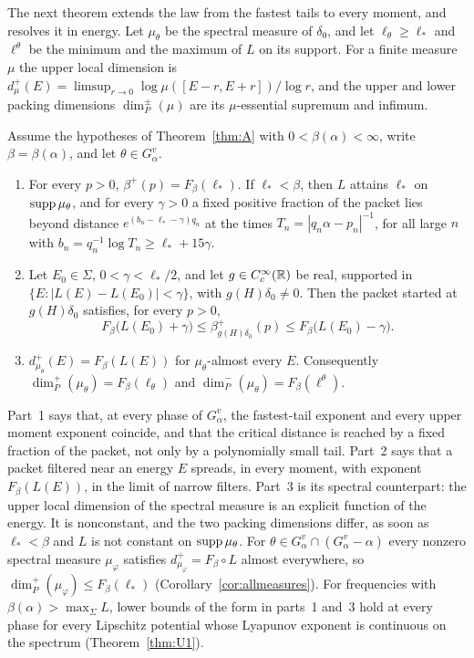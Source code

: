 The next theorem extends the law from the fastest tails to every moment, and resolves it in energy. Let $\mu_\theta$ be the spectral measure of $\delta_0$, and let $\ell_\theta\ge\ell_*$ and $\ell^\theta$ be the minimum and the maximum of $L$ on its support. For a finite measure $\mu$ the upper local dimension is $d^+_\mu(E)=\limsup_{r\to0}\log\mu([E-r,E+r])/\log r$, and the upper and lower packing dimensions $\dim_P^\pm(\mu)$ are its $\mu$-essential supremum and infimum.

\begin{maintheorem}\label{thm:B}
Assume the hypotheses of Theorem~\ref{thm:A} with $0<\beta(\alpha)<\infty$, write $\beta=\beta(\alpha)$, and let $\theta\in G^v_\alpha$.
\begin{enumerate}
\item For every $p>0$, $\beta^+(p)=F_\beta(\ell_*)$. If $\ell_*<\beta$, then $L$ attains $\ell_*$ on $\operatorname{supp}\mu_\theta$, and for every $\gamma>0$ a fixed positive fraction of the packet lies beyond distance $e^{(b_n-\ell_*-\gamma)q_n}$ at the times $T_n=|q_n\alpha-p_n|^{-1}$, for all large $n$ with $b_n=q_n^{-1}\log T_n\ge\ell_*+15\gamma$.
\item Let $E_0\in\Sigma$, $0<\gamma<\ell_*/2$, and let $g\in C_c^\infty(\mathbb R)$ be real, supported in $\{E:|L(E)-L(E_0)|<\gamma\}$, with $g(H)\delta_0\ne0$. Then the packet started at $g(H)\delta_0$ satisfies, for every $p>0$,
\[
F_\beta\bigl(L(E_0)+\gamma\bigr)\le\beta^+_{g(H)\delta_0}(p)\le F_\beta\bigl(L(E_0)-\gamma\bigr).
\]
\item $d^+_{\mu_\theta}(E)=F_\beta(L(E))$ for $\mu_\theta$-almost every $E$. Consequently $\dim_P^+(\mu_\theta)=F_\beta(\ell_\theta)$ and $\dim_P^-(\mu_\theta)=F_\beta(\ell^\theta)$.
\end{enumerate}
\end{maintheorem}

Part~1 says that, at every phase of $G^v_\alpha$, the fastest-tail exponent and every upper moment exponent coincide, and that the critical distance is reached by a fixed fraction of the packet, not only by a polynomially small tail. Part~2 says that a packet filtered near an energy $E$ spreads, in every moment, with exponent $F_\beta(L(E))$, in the limit of narrow filters. Part~3 is its spectral counterpart: the upper local dimension of the spectral measure is an explicit function of the energy. It is nonconstant, and the two packing dimensions differ, as soon as $\ell_*<\beta$ and $L$ is not constant on $\operatorname{supp}\mu_\theta$. For $\theta\in G^v_\alpha\cap(G^v_\alpha-\alpha)$ every nonzero spectral measure $\mu_\varphi$ satisfies $d^+_{\mu_\varphi}=F_\beta\circ L$ almost everywhere, so $\dim_P^+(\mu_\varphi)\le F_\beta(\ell_*)$ (Corollary~\ref{cor:allmeasures}). For frequencies with $\beta(\alpha)>\max_\Sigma L$, lower bounds of the form in parts~1 and~3 hold at every phase for every Lipschitz potential whose Lyapunov exponent is continuous on the spectrum (Theorem~\ref{thm:U1}).

